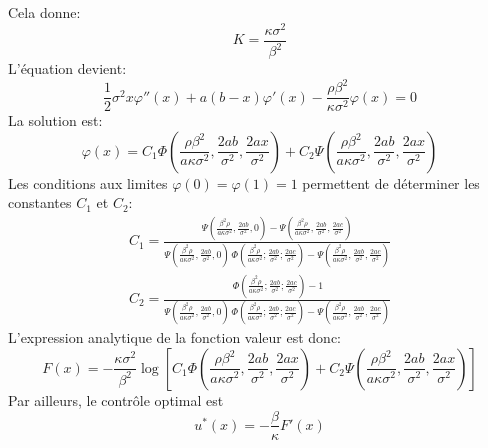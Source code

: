 Cela donne:
\[
K=\frac{\kappa \sigma^2}{\beta^2}
\]
L'équation devient:
\begin{equation}\label{eq_exemple1}
    \frac{1}{2}\sigma^2 x\varphi''(x) + a(b - x)\varphi'(x) - \frac{\rho\beta^2}{\kappa \sigma^2}\varphi(x) = 0
\end{equation}
La solution est:
\[
\varphi(x)=C_1\Phi\left(\frac{\rho\beta^2}{a\kappa \sigma^2},\frac{2ab}{\sigma^2},\frac{2ax}{\sigma^2}\right) + C_2\Psi\left(\frac{\rho\beta^2}{a\kappa \sigma^2},\frac{2ab}{\sigma^2},\frac{2ax}{\sigma^2}\right)
\]
Les conditions aux limites $\varphi(0)=\varphi(1)=1$ permettent de déterminer les constantes $C_1$ et $C_2$:
\begin{equation}\label{control_constants}
    \begin{aligned}
        C_1=\frac{\Psi\left(\frac{\beta ^2 \rho }{a \kappa  \sigma ^2},\frac{2 a b}{\sigma ^2},0\right)-\Psi\left(\frac{\beta ^2 \rho }{a \kappa  \sigma ^2},\frac{2 a b}{\sigma ^2},\frac{2 a c}{\sigma ^2}\right)}{\Psi\left(\frac{\beta ^2 \rho }{a \kappa  \sigma ^2},\frac{2 a b}{\sigma ^2},0\right) \, \Phi\left(\frac{\beta ^2 \rho }{a \kappa  \sigma ^2};\frac{2 a b}{\sigma ^2};\frac{2 a c}{\sigma ^2}\right)-\Psi\left(\frac{\beta ^2 \rho }{a \kappa  \sigma ^2},\frac{2 a b}{\sigma ^2},\frac{2 a c}{\sigma ^2}\right)} \\
        C_2= \frac{\, \Phi\left(\frac{\beta ^2 \rho }{a \kappa  \sigma ^2};\frac{2 a b}{\sigma ^2};\frac{2 a c}{\sigma ^2}\right)-1}{\Psi\left(\frac{\beta ^2 \rho }{a \kappa  \sigma ^2},\frac{2 a b}{\sigma ^2},0\right) \, \Phi\left(\frac{\beta ^2 \rho }{a \kappa  \sigma ^2};\frac{2 a b}{\sigma ^2};\frac{2 a c}{\sigma ^2}\right)-\Psi\left(\frac{\beta ^2 \rho }{a \kappa  \sigma ^2},\frac{2 a b}{\sigma ^2},\frac{2 a c}{\sigma ^2}\right)}
    \end{aligned}
\end{equation}
L'expression analytique de la fonction valeur est donc:
\begin{equation}\label{sol_control_1}
    F(x)=-\frac{\kappa \sigma^2}{\beta^2} \log\left[C_1\Phi\left(\frac{\rho\beta^2}{a\kappa \sigma^2},\frac{2ab}{\sigma^2},\frac{2ax}{\sigma^2}\right) + C_2\Psi\left(\frac{\rho\beta^2}{a\kappa \sigma^2},\frac{2ab}{\sigma^2},\frac{2ax}{\sigma^2}\right)\right]
\end{equation}
Par ailleurs, le contrôle optimal est
\begin{equation}\label{optimal_control_1}
    u^*(x)=-\frac{\beta}{\kappa}F'(x)
\end{equation}

